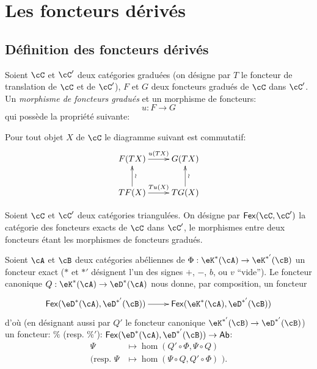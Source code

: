 \section{Les foncteurs d\'eriv\'es}\label{VIII:4}










\subsection{D\'efinition des foncteurs d\'eriv\'es}\label{VIII:4-1}





\begin{definition}\label{VIII:4-1-1}
Soient $\cC$ et $\cC'$ deux cat\'egories gradu\'ees (on d\'esigne par $T$ le 
foncteur de translation de $\cC$ et de $\cC'$), $F$ et $G$ deux foncteurs 
gradu\'es de $\cC$ dans $\cC'$. Un \emph{morphisme de foncteurs gradu\'es} et 
un morphisme de foncteurs: 
\[
  u:F\to G 
\]
qui poss\`ede la propri\'et\'e suivante: 

Pour tout objet $X$ de $\cC$ le diagramme suivant est commutatif: 
\[\xymatrix{
  F(T X) \ar[r]^-{u(T X)} 
    & G(T X) \\
  T F(X) \ar[r]^-{T u(X)} \ar[u]_-\wr 
    & T G(X) \ar[u]_-\wr 
}\]
\end{definition}

Soient $\cC$ et $\cC'$ deux cat\'egories triangul\'ees. On d\'esigne par 
$\mathsf{Fex}(\cC,\cC')$ la cat\'egorie des foncteurs exacts de $\cC$ dans 
$\cC'$, le morphismes entre deux foncteurs \'etant les morphismes de foncteurs 
gradu\'es. 

Soient $\cA$ et $\cB$ deux cat\'egories ab\'eliennes de 
$\Phi:\eK^\ast(\cA)\to \eK^{\ast'}(\cB)$ un foncteur exact ($\ast$ et $\ast'$ 
d\'esignent l'un des signes $+$, $-$, $b$, ou $v$ ``vide''). Le foncteur 
canonique $Q:\eK^\ast(\cA)\to \eD^\ast(\cA)$ nous donne, par composition, un 
foncteur 
\[\xymatrix{
  \mathsf{Fex}(\eD^\ast(\cA),\eD^{\ast'}(\cB)) \ar[r] 
    & \mathsf{Fex}(\eK^\ast(\cA),\eD^{\ast'}(\cB)) 
}\]
d'o\`u (en d\'esignant aussi par $Q'$ le foncteur canonique 
$\eK^{\ast'}(\cB) \to \eD^{\ast'}(\cB)$) un foncteur: 
$\%$ (resp. $\%'$): 
$\mathsf{Fex}(\eD^\ast(\cA),\eD^{\ast'}(\cB)) \to \mathsf{Ab}$: 
\begin{align*}
  \Psi  &\mapsto \hom(Q'\circ \Phi,\Psi\circ Q) \\
  (\text{resp. }\Psi &\mapsto \hom(\Psi\circ Q,Q'\circ \Phi)\text{ ).} 
\end{align*}





